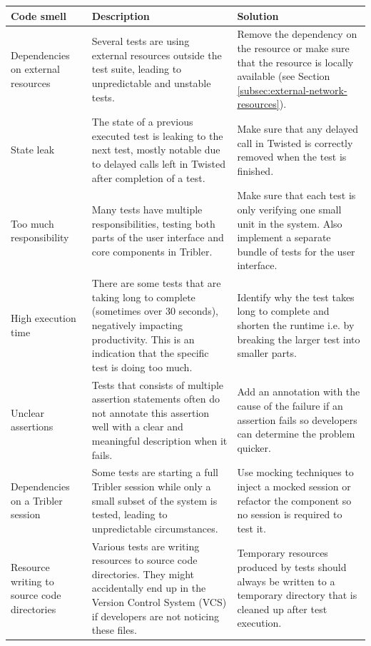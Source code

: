 \begin{table}
	\begin{tabularx}{\textwidth}{|X|X|X|}
		\hline
		\textbf{Code smell} & \textbf{Description} & \textbf{Solution}\\ \hline
		Dependencies on external resources & Several tests are using external resources outside the test suite, leading to unpredictable and unstable tests. & Remove the dependency on the resource or make sure that the resource is locally available (see Section \ref{subsec:external-network-resources}). \\ \hline
		State leak & The state of a previous executed test is leaking to the next test, mostly notable due to delayed calls left in Twisted after completion of a test. & Make sure that any delayed call in Twisted is correctly removed when the test is finished. \\ \hline
		Too much responsibility & Many tests have multiple responsibilities, testing both parts of the user interface and core components in Tribler. & Make sure that each test is only verifying one small unit in the system. Also implement a separate bundle of tests for the user interface.\\ \hline
		High execution time & There are some tests that are taking long to complete (sometimes over 30 seconds), negatively impacting productivity. This is an indication that the specific test is doing too much. & Identify why the test takes long to complete and shorten the runtime i.e. by breaking the larger test into smaller parts. \\ \hline
		Unclear assertions & Tests that consists of multiple assertion statements often do not annotate this assertion well with a clear and meaningful description when it fails. & Add an annotation with the cause of the failure if an assertion fails so developers can determine the problem quicker.\\ \hline
		Dependencies on a Tribler session & Some tests are starting a full Tribler session while only a small subset of the system is tested, leading to unpredictable circumstances. & Use mocking techniques to inject a mocked session or refactor the component so no session is required to test it. \\ \hline
		Resource writing to source code directories & Various tests are writing resources to source code directories. They might accidentally end up in the Version Control System (VCS) if developers are not noticing these files. & Temporary resources produced by tests should always be written to a temporary directory that is cleaned up after test execution. \\ \hline

\end{tabularx}
\end{table}
